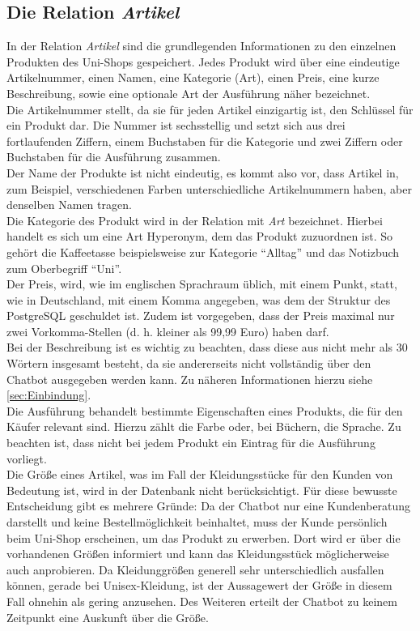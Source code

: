 \subsection{Die Relation \textit{Artikel}}
\label{sec:Artikel}

In der Relation \textit{Artikel} sind die grundlegenden Informationen zu den einzelnen Produkten des Uni-Shops gespeichert. Jedes Produkt wird über eine eindeutige Artikelnummer, einen Namen, eine Kategorie (Art), einen Preis, eine kurze Beschreibung, sowie eine optionale Art der Ausführung näher bezeichnet.\\
Die Artikelnummer stellt, da sie für jeden Artikel einzigartig ist, den Schlüssel für ein Produkt dar. Die Nummer ist sechsstellig und setzt sich aus drei fortlaufenden Ziffern, einem Buchstaben für die Kategorie und zwei Ziffern oder Buchstaben für die Ausführung zusammen.\\
Der Name der Produkte ist nicht eindeutig, es kommt also vor, dass Artikel in, zum Beispiel, verschiedenen Farben unterschiedliche Artikelnummern haben, aber denselben Namen tragen.\\
Die Kategorie des Produkt wird in der Relation mit \textit{Art} bezeichnet. Hierbei handelt es sich um eine Art Hyperonym, dem das Produkt zuzuordnen ist. So gehört die Kaffeetasse beispielsweise zur Kategorie "`Alltag"' und das Notizbuch zum Oberbegriff "`Uni"'.\\
Der Preis, wird, wie im englischen Sprachraum üblich, mit einem Punkt, statt, wie in Deutschland, mit einem Komma angegeben, was dem der Struktur des PostgreSQL geschuldet ist. Zudem ist vorgegeben, dass der Preis maximal nur zwei Vorkomma-Stellen (d. h. kleiner als 99,99 Euro) haben darf.\\
Bei der Beschreibung ist es wichtig zu beachten, dass diese aus nicht mehr als 30 Wörtern insgesamt besteht, da sie andererseits nicht vollständig über den Chatbot ausgegeben werden kann. Zu näheren Informationen hierzu siehe \ref{sec:Einbindung}.\\
Die Ausführung behandelt bestimmte Eigenschaften eines Produkts, die für den Käufer relevant sind. Hierzu zählt die Farbe oder, bei Büchern, die Sprache. Zu beachten ist, dass nicht bei jedem Produkt ein Eintrag für die Ausführung vorliegt.\\
Die Größe eines Artikel, was im Fall der Kleidungsstücke für den Kunden von Bedeutung ist, wird in der Datenbank nicht berücksichtigt. Für diese bewusste Entscheidung gibt es mehrere Gründe: Da der Chatbot nur eine Kundenberatung darstellt und keine Bestellmöglichkeit beinhaltet, muss der Kunde persönlich beim Uni-Shop erscheinen, um das Produkt zu erwerben. Dort wird er über die vorhandenen Größen informiert und kann das Kleidungsstück möglicherweise auch anprobieren. Da Kleidunggrößen generell sehr unterschiedlich ausfallen können, gerade bei Unisex-Kleidung, ist der Aussagewert der Größe in diesem Fall ohnehin als gering anzusehen. Des Weiteren erteilt der Chatbot zu keinem Zeitpunkt eine Auskunft über die Größe.\\
